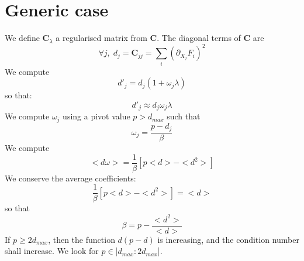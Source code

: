 \documentclass[aps,12pt]{revtex4}
\begin{document}
\section{Generic case}
We define $\bm{C}_\lambda$ a regularised matrix from $\bm{C}$.
The diagonal terms of $\bm{C}$ are
\begin{equation}
	\forall j, \; d_j = \bm{C}_{jj} = \sum_i \left(\partial_{X_j} F_i\right)^2
\end{equation}
We compute
\begin{equation}
	d'_j = d_j (1+\omega_j \lambda)
\end{equation}
so that:
\begin{equation}
	d'_j \approx d_j \omega_j \lambda
\end{equation}
We compute $\omega_j$ using a pivot value $p>d_{max}$ such that
\begin{equation}
	\omega_j = \dfrac{p-d_j}{\beta}
\end{equation}
 We compute
\begin{equation}
	<d\omega> = \dfrac{1}{\beta} \left[ p <d> - <d^2>\right]
\end{equation}
We conserve the average coefficients:
\begin{equation}
	\dfrac{1}{\beta} \left[ p <d> - <d^2>\right] = <d>
\end{equation}
 so that
 \begin{equation}
 	\beta = p - \dfrac{<d^2>}{<d>}
 \end{equation}
 If $p\geq 2d_{max}$, then the function $d(p-d)$ is increasing, and the condition number shall increase. We look
 for $p\in\rbrack d_{max}:2d_{max}\rbrack$.
 
\end{document}
